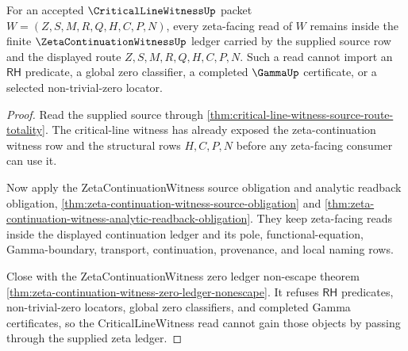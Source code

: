 \begin{theorem}
\label{thm:critical-line-witness-zeta-boundary-nonescape}
For an accepted $\CriticalLineWitnessUp$ packet
$W=(Z,S,M,R,Q,H,C,P,N)$, every zeta-facing read of $W$ remains inside the finite
$\ZetaContinuationWitnessUp$ ledger carried by the supplied source row and the
displayed route $Z,S,M,R,Q,H,C,P,N$. Such a read cannot import an
$\mathsf{RH}$ predicate, a global zero classifier, a completed $\GammaUp$
certificate, or a selected non-trivial-zero locator.
\end{theorem}
\begin{proof}
Read the supplied source through
\autoref{thm:critical-line-witness-source-route-totality}. The
critical-line witness has already exposed the zeta-continuation witness row and
the structural rows $H,C,P,N$ before any zeta-facing consumer can use it.

Now apply the ZetaContinuationWitness source obligation and analytic readback
obligation,
\autoref{thm:zeta-continuation-witness-source-obligation} and
\autoref{thm:zeta-continuation-witness-analytic-readback-obligation}. They keep
zeta-facing reads inside the displayed continuation ledger and its pole,
functional-equation, Gamma-boundary, transport, continuation, provenance, and
local naming rows.

Close with the ZetaContinuationWitness zero ledger non-escape theorem
\autoref{thm:zeta-continuation-witness-zero-ledger-nonescape}. It refuses
$\mathsf{RH}$ predicates, non-trivial-zero locators, global zero classifiers,
and completed Gamma certificates, so the CriticalLineWitness read cannot gain
those objects by passing through the supplied zeta ledger.
\end{proof}

